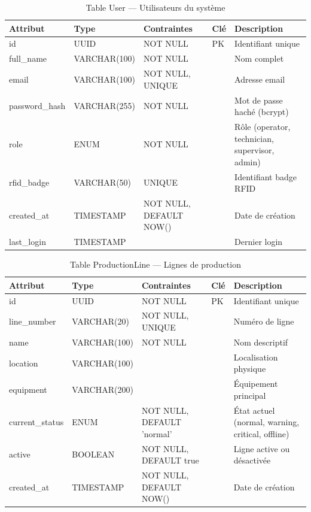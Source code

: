 \begin{table}[htbp]
\centering
\scriptsize
\caption{Table User — Utilisateurs du système}
\label{tab:table_user}
\begin{tabular}{|p{2.5cm}|p{2cm}|p{2cm}|p{1.5cm}|p{4cm}|}
\hline
\rowcolor{sewesblu!20}
\textbf{Attribut} & \textbf{Type} & \textbf{Contraintes} & \textbf{Clé} & \textbf{Description} \\
\hline
id & UUID & NOT NULL & PK & Identifiant unique \\
\hline
full\_name & VARCHAR(100) & NOT NULL & & Nom complet \\
\hline
email & VARCHAR(100) & NOT NULL, UNIQUE & & Adresse email \\
\hline
password\_hash & VARCHAR(255) & NOT NULL & & Mot de passe haché (bcrypt) \\
\hline
role & ENUM & NOT NULL & & Rôle (operator, technician, supervisor, admin) \\
\hline
rfid\_badge & VARCHAR(50) & UNIQUE & & Identifiant badge RFID \\
\hline
created\_at & TIMESTAMP & NOT NULL, DEFAULT NOW() & & Date de création \\
\hline
last\_login & TIMESTAMP & & & Dernier login \\
\hline
\end{tabular}
\end{table}

\begin{table}[htbp]
\centering
\scriptsize
\caption{Table ProductionLine — Lignes de production}
\label{tab:table_line}
\begin{tabular}{|p{2.5cm}|p{2cm}|p{2cm}|p{1.5cm}|p{4cm}|}
\hline
\rowcolor{sewesblu!20}
\textbf{Attribut} & \textbf{Type} & \textbf{Contraintes} & \textbf{Clé} & \textbf{Description} \\
\hline
id & UUID & NOT NULL & PK & Identifiant unique \\
\hline
line\_number & VARCHAR(20) & NOT NULL, UNIQUE & & Numéro de ligne \\
\hline
name & VARCHAR(100) & NOT NULL & & Nom descriptif \\
\hline
location & VARCHAR(100) & & & Localisation physique \\
\hline
equipment & VARCHAR(200) & & & Équipement principal \\
\hline
current\_status & ENUM & NOT NULL, DEFAULT 'normal' & & État actuel (normal, warning, critical, offline) \\
\hline
active & BOOLEAN & NOT NULL, DEFAULT true & & Ligne active ou désactivée \\
\hline
created\_at & TIMESTAMP & NOT NULL, DEFAULT NOW() & & Date de création \\
\hline
\end{tabular}
\end{table}

